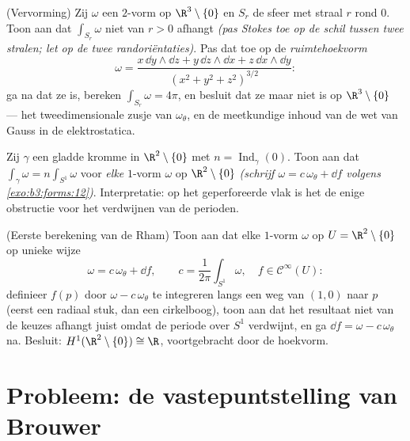 \begin{exercise}[$\star\star\star$]\label{exo:b3:forms:10}
(Vervorming) Zij $\omega$ een \emph{} $2$-vorm op
$\R^3\setminus\{0\}$ en $S_r$ de sfeer met straal $r$ rond $0$.
Toon aan dat $\int_{S_r}\omega$ niet van $r > 0$ afhangt
\emph{(pas Stokes toe op de schil tussen twee stralen; let op de
twee randoriëntaties)}. Pas dat toe op de \emph{ruimtehoekvorm}
\[
\omega = \frac{x\,\dd y\wedge\dd z + y\,\dd z\wedge\dd x +
z\,\dd x\wedge\dd y}{(x^2 + y^2 + z^2)^{3/2}} :
\]
ga na dat ze  is, bereken $\int_{S_r}\omega = 4\pi$, en
besluit dat ze  maar niet  is op
$\R^3\setminus\{0\}$ --- het tweedimensionale zusje van
$\omega_\theta$, en de meetkundige inhoud van de wet van Gauss in
de elektrostatica.
\end{exercise}

\begin{exercise}[$\star\star$]\label{exo:b3:forms:11}
Zij $\gamma$ een gladde  kromme in $\R^2\setminus\{0\}$
met $n = \operatorname{Ind}_\gamma(0)$. Toon aan dat
$\int_\gamma\omega = n\int_{S^1}\omega$ voor \emph{elke} 
$1$-vorm $\omega$ op $\R^2\setminus\{0\}$ \emph{(schrijf $\omega
= c\,\omega_\theta + \dd f$ volgens \cref{exo:b3:forms:12})}.
Interpretatie: op het geperforeerde vlak is het  de
enige obstructie voor het verdwijnen van de perioden.
\end{exercise}

\begin{exercise}[$\star\star\star$]\label{exo:b3:forms:12}
(Eerste berekening van de Rham) Toon aan dat elke 
$1$-vorm $\omega$ op $U = \R^2\setminus\{0\}$ op unieke wijze
\[
\omega = c\,\omega_\theta + \dd f,
\qquad c = \frac1{2\pi}\int_{S^1}\omega,\quad f \in
\mathcal C^\infty(U) :
\]
definieer $f(p)$ door $\omega - c\,\omega_\theta$ te integreren
langs een weg van $(1,0)$ naar $p$ (eerst een radiaal stuk, dan
een cirkelboog), toon aan dat het resultaat niet van de keuzes
afhangt juist omdat de periode over $S^1$ verdwijnt, en ga $\dd f
= \omega - c\,\omega_\theta$ na. Besluit:
$H^1(\R^2\setminus\{0\}) \cong \R$, voortgebracht door de
hoekvorm.
\end{exercise}

\section{Probleem: de vastepuntstelling van Brouwer}

